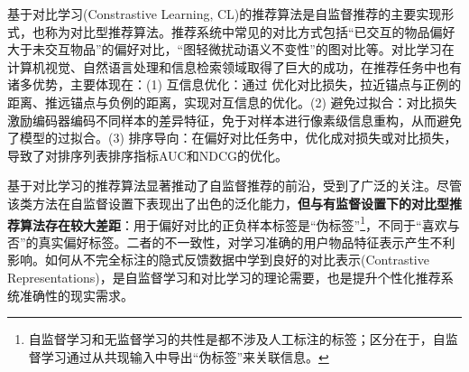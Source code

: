 基于对比学习(Constrastive Learning, CL)\cite{zhang:cl}的推荐算法是自监督推荐的主要实现形式\cite{SSR:2023:TKDE}，也称为对比型推荐算法。推荐系统中常见的对比方式包括“已交互的物品偏好大于未交互物品”的偏好对比\cite{Steffen:2009:UAI,Jingtao:2019:IJCAI,Xiangnan:2020:SIGIR,Wang:2019:SIGIR}，“图轻微扰动语义不变性”的图对比\cite{shuai2022review,lightgcl:2023:ICLR,wu:2023:TKDE}等。对比学习在计算机视觉、自然语言处理和信息检索领域取得了巨大的成功\cite{Oord:2018:arxiv,Chen:2020:ICML,BYOL:2020:NIPS,Khosla:2020:NIPS,graph:CL,graph:self,cl:bei,xiao:cl}，在推荐任务中也有诸多优势，主要体现在：(1) 互信息优化：通过
优化对比损失，拉近锚点与正例的距离、推远锚点与负例的距离，实现对互信息的优化\cite{Oord:2018:arxiv,yang2021enhanced,cao2021bipartite,zhou2020s3}。(2) 避免过拟合：对比损失激励编码器编码不同样本的差异特征，免于对样本进行像素级信息重构，从而避免了模型的过拟合\cite{Oord:2018:arxiv}。(3) 排序导向：在偏好对比任务中，优化成对损失或对比损失，导致了对排序列表排序指标AUC和NDCG的优化\cite{Steffen:2009:UAI,Jiancan:2022:arxiv}。

%


基于对比学习的推荐算法显著推动了自监督推荐的前沿\cite{SSR:2023:TKDE}，受到了广泛的关注\cite{liu2021contrastive,10.1145/3477495.3532009,qiu2022contrastive,yu2023xsimgcl}。尽管该类方法在自监督设置下表现出了出色的泛化能力，\textbf{但与有监督设置下的对比型推荐算法存在较大差距}\cite{Chuang:2020:NIPS,SSR:2023:TKDE,Khosla:2020:NIPS,zhang:cl}：用于偏好对比的正负样本标签是“伪标签”\footnote{自监督学习和无监督学习的共性是都不涉及人工标注的标签\cite{He:2020:CVPR}；区分在于，自监督学习通过从共现输入中导出“伪标签”来关联信息\cite{Liu:2021:TKDE}。}，不同于“喜欢与否”的真实偏好标签。二者的不一致性，对学习准确的用户物品特征表示产生不利影响。如何从不完全标注的隐式反馈数据中学到良好的对比表示(Contrastive Representations)，是自监督学习和对比学习的理论需要，也是提升个性化推荐系统准确性的现实需求。

